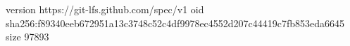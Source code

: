 version https://git-lfs.github.com/spec/v1
oid sha256:f89340eeb672951a13c3748c52c4df9978ec4552d207c44419c7fb853eda6645
size 97893
